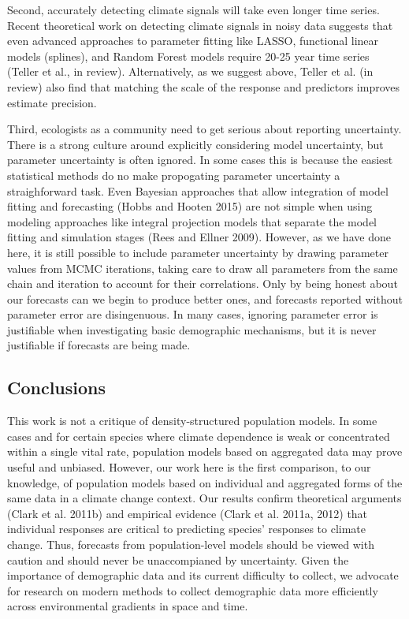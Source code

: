 \documentclass[12pt,]{article}
\begin{document}
Second, accurately detecting climate signals will take even longer time
series. Recent theoretical work on detecting climate signals in noisy
data suggests that even advanced approaches to parameter fitting like
LASSO, functional linear models (splines), and Random Forest models
require 20-25 year time series (Teller et al., in review).
Alternatively, as we suggest above, Teller et al. (in review) also find
that matching the scale of the response and predictors improves estimate
precision.

Third, ecologists as a community need to get serious about reporting
uncertainty. There is a strong culture around explicitly considering
model uncertainty, but parameter uncertainty is often ignored. In some
cases this is because the easiest statistical methods do no make
propogating parameter uncertainty a straighforward task. Even Bayesian
approaches that allow integration of model fitting and forecasting
(Hobbs and Hooten 2015) are not simple when using modeling approaches
like integral projection models that separate the model fitting and
simulation stages (Rees and Ellner 2009). However, as we have done here,
it is still possible to include parameter uncertainty by drawing
parameter values from MCMC iterations, taking care to draw all
parameters from the same chain and iteration to account for their
correlations. Only by being honest about our forecasts can we begin to
produce better ones, and forecasts reported without parameter error are
disingenuous. In many cases, ignoring parameter error is justifiable
when investigating basic demographic mechanisms, but it is never
justifiable if forecasts are being made.

\subsection{Conclusions}\label{conclusions}

This work is not a critique of density-structured population models. In
some cases and for certain species where climate dependence is weak or
concentrated within a single vital rate, population models based on
aggregated data may prove useful and unbiased. However, our work here is
the first comparison, to our knowledge, of population models based on
individual and aggregated forms of the same data in a climate change
context. Our results confirm theoretical arguments (Clark et al. 2011b)
and empirical evidence (Clark et al. 2011a, 2012) that individual
responses are critical to predicting species' responses to climate
change. Thus, forecasts from population-level models should be viewed
with caution and should never be unaccompianed by uncertainty. Given the
importance of demographic data and its current difficulty to collect, we
advocate for research on modern methods to collect demographic data more
efficiently across environmental gradients in space and time.
\end{document}
